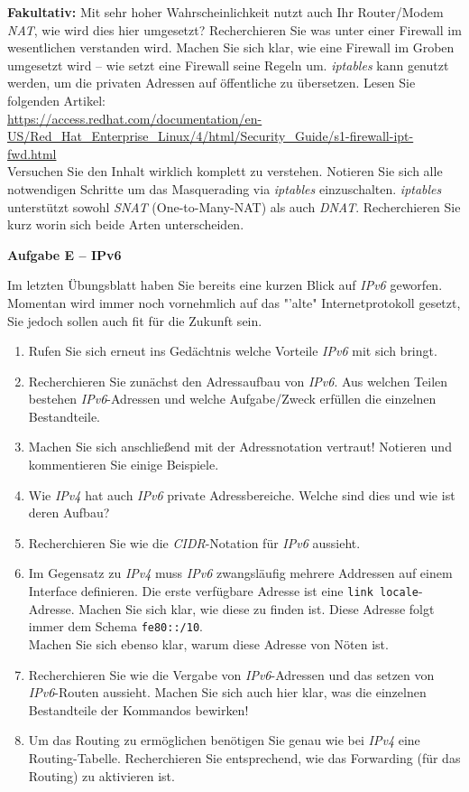 \documentclass[paper=a4,fontsize=11pt]{scrartcl}%
\numberwithin{equation}{section}
\begin{document}
\begin{enumerate}
\begin{tasks}
		\task \textbf{Fakultativ:} Mit sehr hoher Wahrscheinlichkeit nutzt auch Ihr Router/Modem \emph{NAT}, wie wird dies hier umgesetzt?
		\task Recherchieren Sie was unter einer Firewall im wesentlichen verstanden wird.
		\task Machen Sie sich klar, wie eine Firewall im Groben umgesetzt wird -- wie setzt eine Firewall seine Regeln um.
		\task \emph{iptables} kann genutzt werden, um die privaten Adressen auf öffentliche zu übersetzen. Lesen Sie folgenden Artikel:\\
		\url{https://access.redhat.com/documentation/en-US/Red_Hat_Enterprise_Linux/4/html/Security_Guide/s1-firewall-ipt-fwd.html}\\
		Versuchen Sie den Inhalt wirklich komplett zu verstehen. Notieren Sie sich alle notwendigen Schritte um das Masquerading via \emph{iptables} einzuschalten.
		\task \emph{iptables} unterstützt sowohl \emph{SNAT} (One-to-Many-NAT) als auch \emph{DNAT}. Recherchieren Sie kurz worin sich beide Arten unterscheiden.
	\end{tasks}
\end{enumerate}

\begin{center}\Large{\textbf{Aufgabe E -- IPv6}}\end{center}\vskip0.25in
Im letzten Übungsblatt haben Sie bereits eine kurzen Blick auf \emph{IPv6} geworfen. Momentan wird immer noch vornehmlich auf das "'alte" Internetprotokoll gesetzt, Sie jedoch sollen auch fit für die Zukunft sein.
\begin{enumerate}
	\item Rufen Sie sich erneut ins Gedächtnis welche Vorteile \emph{IPv6} mit sich bringt.
	\item Recherchieren Sie zunächst den Adressaufbau von \emph{IPv6}. Aus welchen Teilen bestehen \emph{IPv6}-Adressen und welche Aufgabe/Zweck erfüllen die einzelnen Bestandteile.
	\item Machen Sie sich anschließend mit der Adressnotation vertraut! Notieren und kommentieren Sie einige Beispiele.
	\item Wie \emph{IPv4} hat auch \emph{IPv6} private Adressbereiche. Welche sind dies und wie ist deren Aufbau?
	\item Recherchieren Sie wie die \emph{CIDR}-Notation für \emph{IPv6} aussieht.
	\item Im Gegensatz zu \emph{IPv4} muss \emph{IPv6} zwangsläufig mehrere Addressen auf einem Interface definieren. Die erste verfügbare Adresse ist eine \texttt{link locale}-Adresse. Machen Sie sich klar, wie diese zu finden ist. Diese Adresse folgt immer dem Schema  \texttt{fe80::/10}.\\
	Machen Sie sich ebenso klar, warum diese Adresse von Nöten ist.
	\item Recherchieren Sie wie die Vergabe von \emph{IPv6}-Adressen und das setzen von \emph{IPv6}-Routen aussieht. Machen Sie sich auch hier klar, was die einzelnen Bestandteile der Kommandos bewirken!
	\item Um das Routing zu ermöglichen benötigen Sie genau wie bei \emph{IPv4} eine Routing-Tabelle. Recherchieren Sie entsprechend, wie das Forwarding (für das Routing) zu aktivieren ist.
\end{enumerate}


\end{document}

